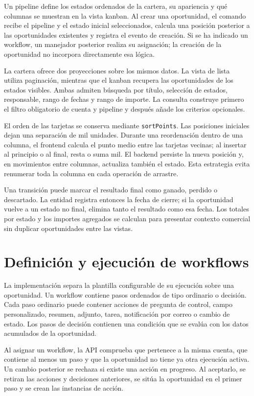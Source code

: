 Un pipeline define los estados ordenados de la cartera, su apariencia y qué
columnas se muestran en la vista kanban. Al crear una oportunidad, el comando
recibe el pipeline y el estado inicial seleccionados, calcula una posición
posterior a las oportunidades existentes y registra el evento de creación. Si
se ha indicado un workflow, un manejador posterior realiza su asignación; la
creación de la oportunidad no incorpora directamente esa lógica.

La cartera ofrece dos proyecciones sobre los mismos datos. La vista de lista
utiliza paginación, mientras que el kanban recupera las oportunidades de los
estados visibles. Ambas admiten búsqueda por título, selección de estados,
responsable, rango de fechas y rango de importe. La consulta construye primero
el filtro obligatorio de cuenta y pipeline y después añade los criterios
opcionales.

El orden de las tarjetas se conserva mediante \texttt{sortPoints}. Las
posiciones iniciales dejan una separación de mil unidades. Durante una
reordenación dentro de una columna, el frontend calcula el punto medio entre
las tarjetas vecinas; al insertar al principio o al final, resta o suma mil.
El backend persiste la nueva posición y, en movimientos entre columnas,
actualiza también el estado. Esta estrategia evita renumerar toda la columna
en cada operación de arrastre.

Una transición puede marcar el resultado final como ganado, perdido o
descartado. La entidad registra entonces la fecha de cierre; si la oportunidad
vuelve a un estado no final, elimina tanto el resultado como esa fecha. Los
totales por estado y los importes agregados se calculan para presentar contexto
comercial sin duplicar oportunidades entre las vistas.

\section{Definición y ejecución de workflows}

La implementación separa la plantilla configurable de su ejecución sobre una
oportunidad. Un workflow contiene pasos ordenados de tipo ordinario o decisión.
Cada paso ordinario puede contener acciones de pregunta de control, campo
personalizado, resumen, adjunto, tarea, notificación por correo o cambio de
estado. Los pasos de decisión contienen una condición que se evalúa con los
datos acumulados de la oportunidad.

Al asignar un workflow, la API comprueba que pertenece a la misma cuenta, que
contiene al menos un paso y que la oportunidad no tiene ya otra ejecución
activa. Un cambio posterior se rechaza si existe una acción en progreso. Al
aceptarlo, se retiran las acciones y decisiones anteriores, se sitúa la
oportunidad en el primer paso y se crean las instancias de acción.

